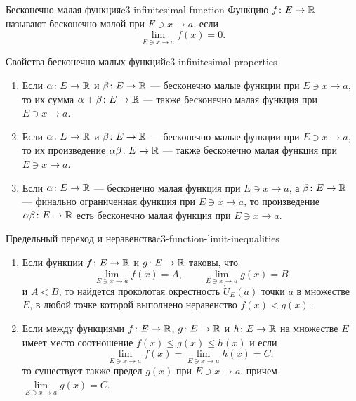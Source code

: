 \begin{definition}{Бесконечно малая функция}{c3-infinitesimal-function}
  Функцию $f\colon E\to\mathbb{R}$ называют бесконечно малой при $E\ni x\to a$,
  если
  \[
    \lim_{E\ni x\to a}f(x)=0.
  \]
\end{definition}

\begin{proposition}{Свойства бесконечно малых функций}{c3-infinitesimal-properties}
  \begin{enumerate}[label=\alph*)]
    \item Если $\alpha\colon E\to\mathbb{R}$ и $\beta\colon E\to\mathbb{R}$ — бесконечно
      малые функции при $E\ni x\to a$, то их сумма
      $\alpha+\beta\colon E\to\mathbb{R}$ — также бесконечно малая функция при
      $E\ni x\to a$.
    \item Если $\alpha\colon E\to\mathbb{R}$ и $\beta\colon E\to\mathbb{R}$ — бесконечно
      малые функции при $E\ni x\to a$, то их произведение
      $\alpha\beta\colon E\to\mathbb{R}$ — также бесконечно малая функция при
      $E\ni x\to a$.
    \item Если $\alpha\colon E\to\mathbb{R}$ — бесконечно малая функция при
      $E\ni x\to a$, а $\beta\colon E\to\mathbb{R}$ — финально ограниченная
      функция при $E\ni x\to a$, то произведение
      $\alpha\beta\colon E\to\mathbb{R}$ есть бесконечно малая функция при
      $E\ni x\to a$.
  \end{enumerate}
\end{proposition}

\begin{theorem}{Предельный переход и неравенства}{c3-function-limit-inequalities}
  \begin{enumerate}[label=\alph*)]
    \item Если функции $f\colon E\to\mathbb{R}$ и $g\colon E\to\mathbb{R}$ таковы, что
      \[
        \lim_{E\ni x\to a}f(x)=A,
        \qquad
        \lim_{E\ni x\to a}g(x)=B
      \]
      и $A<B$, то найдется проколотая окрестность $\mathring U_E(a)$ точки
      $a$ в множестве $E$, в любой точке которой выполнено неравенство
      $f(x)<g(x)$.
    \item Если между функциями $f\colon E\to\mathbb{R}$, $g\colon E\to\mathbb{R}$ и
      $h\colon E\to\mathbb{R}$ на множестве $E$ имеет место соотношение
      $f(x)\le g(x)\le h(x)$ и если
      \[
        \lim_{E\ni x\to a}f(x)=
        \lim_{E\ni x\to a}h(x)=C,
      \]
      то существует также предел $g(x)$ при $E\ni x\to a$, причем
      $\lim\limits_{E\ni x\to a}g(x)=C$.
  \end{enumerate}
\end{theorem}

